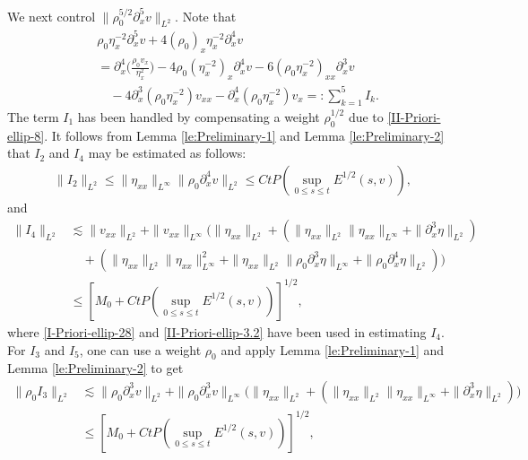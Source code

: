 \documentclass[11pt, reqno]{amsart}
\numberwithin{equation}{section}
\begin{document}
{We next control \(\|\rho_0^{5/2}\partial_x^5v\|_{L^2}\).
Note that
\begin{equation*}
\begin{aligned}
&\rho_0\eta_x^{-2}\partial_x^5v+4(\rho_0)_x\eta_x^{-2}\partial_x^4v\\
&=\partial_x^4\bigg(\frac{\rho_0v_x}{\eta_x^2}\bigg)-4\rho_0(\eta_x^{-2})_x\partial_x^4v-6(\rho_0\eta_x^{-2})_{xx}\partial_x^3v\\
&\quad-4\partial_x^3(\rho_0\eta_x^{-2})v_{xx}-\partial_x^4(\rho_0\eta_x^{-2})v_x=\colon \sum_{k=1}^5I_k.
\end{aligned}
\end{equation*}
The term \(I_1\) has been handled by compensating a weight \(\rho_0^{1/2}\) due to \eqref{II-Priori-ellip-8}.
It follows from Lemma \ref{le:Preliminary-1} and Lemma \ref{le:Preliminary-2} that \(I_2\) and \(I_4\) may be estimated as follows:
\begin{equation*}
\begin{aligned}
\|I_2\|_{L^2}
\leq \|\eta_{xx}\|_{L^\infty}\|\rho_0\partial_x^4v\|_{L^2}
\leq Ct P(\sup_{0\leq s\leq t}E^{1/2}(s,v)),
\end{aligned}
\end{equation*}
and
\begin{equation*}
\begin{aligned}
\|I_4\|_{L^2}
&\lesssim \|v_{xx}\|_{L^2}+
\|v_{xx}\|_{L^\infty}\big(\|\eta_{xx}\|_{L^2}
+(\|\eta_{xx}\|_{L^2}\|\eta_{xx}\|_{L^\infty}
+\|\partial_x^3\eta\|_{L^2})\\
&\quad+(\|\eta_{xx}\|_{L^2}\|\eta_{xx}\|_{L^\infty}^2
+\|\eta_{xx}\|_{L^2}\|\rho_0\partial_x^3\eta\|_{L^\infty}
+\|\rho_0\partial_x^4\eta\|_{L^2})\big)\\
&\leq [M_0+Ct P(\sup_{0\leq s\leq t}E^{1/2}(s,v))]^{1/2},
\end{aligned}
\end{equation*}
where \eqref{I-Priori-ellip-28} and \eqref{II-Priori-ellip-3.2} have been used in estimating  \(I_4\).
For \(I_3\) and \(I_5\), one can use a weight \(\rho_0\) and apply Lemma \ref{le:Preliminary-1} and Lemma \ref{le:Preliminary-2} to get
{\small \begin{equation*}
\begin{aligned}
\|\rho_0I_3\|_{L^2}
&\lesssim \|\rho_0\partial_x^3v\|_{L^2}+
\|\rho_0\partial_x^3v\|_{L^\infty}\big(\|\eta_{xx}\|_{L^2}+
(\|\eta_{xx}\|_{L^2}\|\eta_{xx}\|_{L^\infty}
+\|\partial_x^3\eta\|_{L^2})\big)\\
&\leq [M_0+Ct P(\sup_{0\leq s\leq t}E^{1/2}(s,v))]^{1/2},

\end{aligned}
\end{equation*}}}
\end{document}
